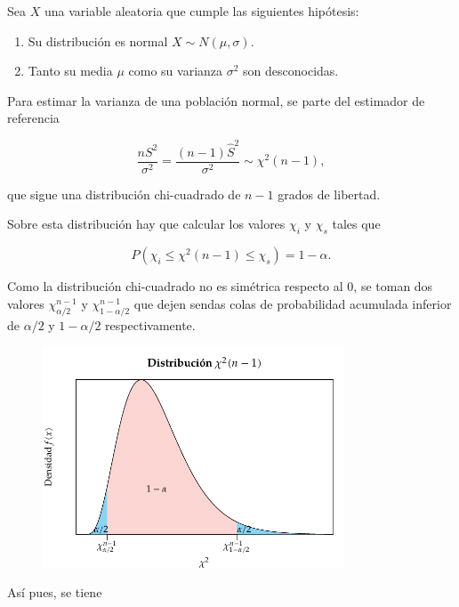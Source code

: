 \documentclass[
  a4paper,
]{scrreport}
\providecommand{\tightlist}{%
  \setlength{\itemsep}{0pt}\setlength{\parskip}{0pt}}\usepackage{longtable,booktabs,array}
\theoremstyle{definition}
\theoremstyle{definition}
\theoremstyle{plain}
\theoremstyle{remark}
\begin{document}
Sea \(X\) una variable aleatoria que cumple las siguientes hipótesis:

\begin{enumerate}
\def\labelenumi{\arabic{enumi}.}
\tightlist
\item
  Su distribución es normal \(X\sim N(\mu,\sigma)\).
\item
  Tanto su media \(\mu\) como su varianza \(\sigma^2\) son desconocidas.
\end{enumerate}

Para estimar la varianza de una población normal, se parte del estimador
de referencia

\[
\frac{nS^2}{\sigma^2} = \frac{(n-1)\hat{S}^2}{\sigma^2}\sim \chi^2(n-1),
\]

que sigue una distribución chi-cuadrado de \(n-1\) grados de libertad.

Sobre esta distribución hay que calcular los valores \(\chi_i\) y
\(\chi_s\) tales que

\[
P(\chi_i\leq \chi^2(n-1) \leq \chi_s) = 1-\alpha.
\]

Como la distribución chi-cuadrado no es simétrica respecto al 0, se
toman dos valores \(\chi^{n-1}_{\alpha/2}\) y
\(\chi^{n-1}_{1-\alpha/2}\) que dejen sendas colas de probabilidad
acumulada inferior de \(\alpha/2\) y \(1-\alpha/2\) respectivamente.

\begin{figure}

{\centering \includegraphics[width=0.8\textwidth,height=\textheight]{img/estimacion/extremos-intervalo-varianza-normal.pdf}

}

\end{figure}

Así pues, se tiene
\end{document}
